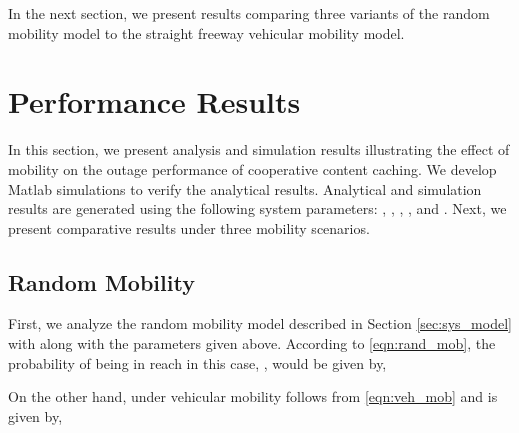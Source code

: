 \documentclass[conference,a4paper]{IEEEtran}
\begin{document}
In the next section, we present results comparing three variants of the random mobility model to the straight freeway vehicular mobility model.

\section{Performance Results \label{sec:results}}
In this section, we present analysis and simulation results illustrating the effect of mobility on the outage performance of cooperative content caching. We develop Matlab simulations to verify the analytical results. Analytical and simulation results are generated using the following system parameters: , , , , and . Next, we present comparative results under three mobility scenarios.

\subsection{Random Mobility\label{subsec:rand_mob_res}}
First, we analyze the random mobility model described in Section \ref{sec:sys_model} with  along with the parameters given above. According to \eqref{eqn:rand_mob}, the probability of being in reach in this case, , would be given by,

On the other hand,  under vehicular mobility follows from \eqref{eqn:veh_mob} and is given by,
\end{document}
